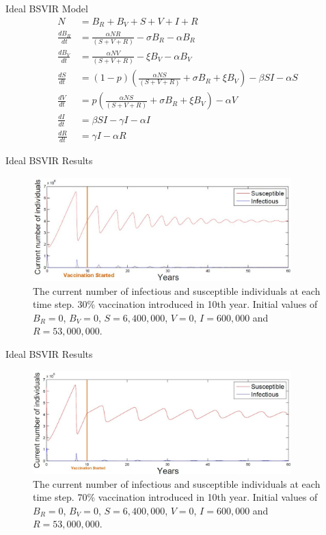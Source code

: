 \documentclass{beamer}
\begin{document}
\begin{frame} {Ideal BSVIR} {Model}
\begin{align*}
N &= B_R + B_V + S + V + I + R \\
\frac{dB_R}{dt} &= \frac{\alpha N R}{\left( S+V+R \right)} - \sigma B_R - \alpha B_R\\
\frac{dB_V}{dt} &= \frac{\alpha N V}{\left( S+V+R \right)} - \xi B_V - \alpha B_V\\
\frac{dS}{dt} &= (1-p) \left(\frac{\alpha N S}{\left( S+V+R \right)} + \sigma B_R + \xi B_V\right)- \beta SI - \alpha S \\ 
\frac{dV}{dt} &= p \left(\frac{\alpha N S}{\left( S+V+R \right)} + \sigma B_R + \xi B_V\right) - \alpha V \\ 
\frac{dI}{dt} &= \beta SI - \gamma I - \alpha I \\ 
\frac{dR}{dt} &= \gamma I - \alpha R 
\end{align*}
\end{frame}

\begin{frame} {Ideal BSVIR} {Results}
\begin{figure}
\centering
\includegraphics[width=100mm]{figidealbsvir30.jpg}
\caption{The current number of infectious and susceptible individuals at each time step. 30\% vaccination introduced in 10th year. Initial values of $B_R=0$, $B_V=0$, $S=6,400,000$, $V=0$, $I=600,000$ and $R=53,000,000$.}
\end{figure}
\end{frame}

\begin{frame} {Ideal BSVIR} {Results}
\begin{figure}
\centering
\includegraphics[width=100mm]{figidealbsvir70.jpg}
\caption{The current number of infectious and susceptible individuals at each time step. 70\% vaccination introduced in 10th year. Initial values of  $B_R=0$, $B_V=0$, $S=6,400,000$, $V=0$, $I=600,000$ and $R=53,000,000$.}
\end{figure}
\end{frame}
\end{document}
